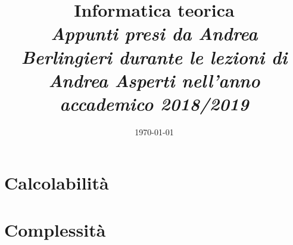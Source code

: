 \documentclass{report}
\begin{document}
\title{ Informatica teorica \\
        \normalsize \it Appunti presi da Andrea Berlingieri durante le lezioni di Andrea Asperti
        nell'anno accademico 2018/2019}
\date{\today}
\maketitle



\tableofcontents
%
\part{Calcolabilità}










\part{Complessità}




%
%
%
%
%
\end{document}
